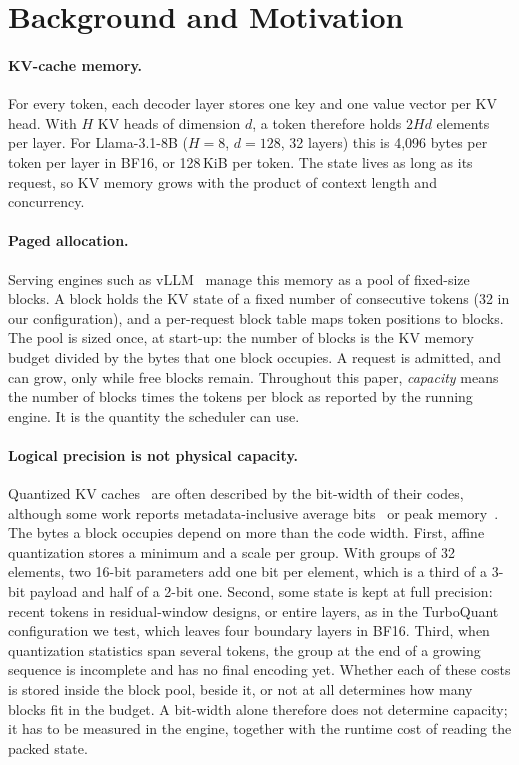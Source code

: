 \documentclass{article}
\begin{document}
\section{Background and Motivation}
\label{sec:background}

\paragraph{KV-cache memory.}
For every token, each decoder layer stores one key and one value vector per KV head. With $H$ KV heads
of dimension $d$, a token therefore holds $2Hd$ elements per layer. For Llama-3.1-8B ($H=8$, $d=128$,
32 layers) this is 4,096 bytes per token per layer in BF16, or 128\,KiB per token. The state lives as
long as its request, so KV memory grows with the product of context length and concurrency.

\paragraph{Paged allocation.}
Serving engines such as vLLM~\citep{kwon2023vllm} manage this memory as a pool of fixed-size blocks. A block holds the
KV state of a fixed number of consecutive tokens (32 in our configuration), and a per-request block
table maps token positions to blocks. The pool is sized once, at start-up: the number of blocks is the
KV memory budget divided by the bytes that one block occupies. A request is admitted, and can grow,
only while free blocks remain. Throughout this paper, \emph{capacity} means the number of blocks times
the tokens per block as reported by the running engine. It is the quantity the scheduler can use.

\paragraph{Logical precision is not physical capacity.}
Quantized KV caches~\citep{liu2024kivi,hooper2024kvquant,zandieh2025turboquant} are often described by
the bit-width of their codes, although some work reports metadata-inclusive average
bits~\citep{duanmu2024skvq} or peak memory~\citep{liu2024kivi}. The bytes a block occupies depend on more
than the code width. First, affine quantization stores a minimum and a
scale per group. With groups of 32 elements, two 16-bit parameters add one bit per element, which is a
third of a 3-bit payload and half of a 2-bit one. Second, some state is kept at full precision: recent
tokens in residual-window designs, or entire layers, as in the TurboQuant configuration we test, which
leaves four boundary layers in BF16. Third, when quantization statistics span several tokens, the group
at the end of a growing sequence is incomplete and has no final encoding yet. Whether each of these
costs is stored inside the block pool, beside it, or not at all determines how many blocks fit in the
budget. A bit-width alone therefore does not determine capacity; it has to be measured in the engine,
together with the runtime cost of reading the packed state.
\end{document}
